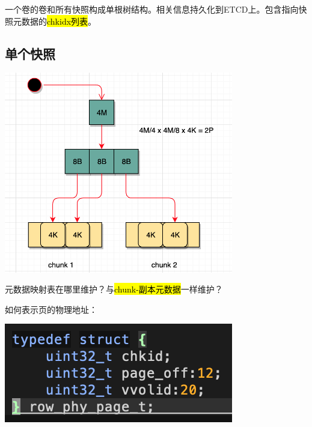 一个卷的卷和所有快照构成单根树结构。相关信息持久化到ETCD上。包含指向快照元数据的\hl{chkidx列表}。



\subsection{单个快照}

\begin{center}
\includegraphics[width=10cm]{../imgs/snapshot/snapshot-head.png}
\end{center}

元数据映射表在哪里维护？与\hl{chunk-副本元数据}一样维护？


如何表示页的物理地址：
\begin{center}
\includegraphics[width=10cm]{../imgs/snapshot/row-phy-page.png}
\end{center}

